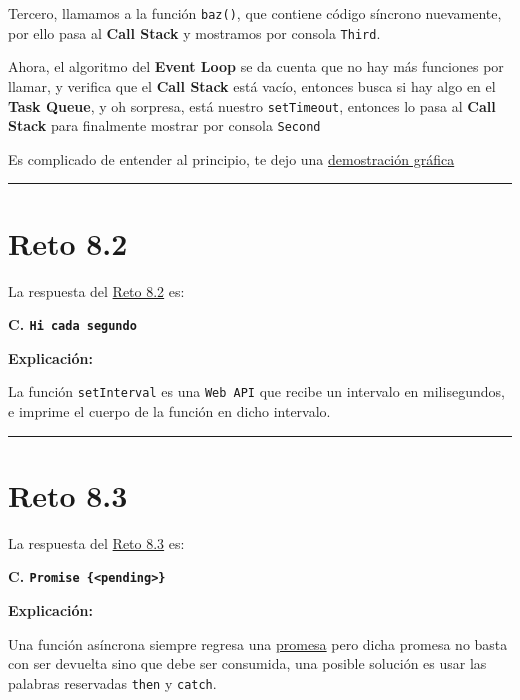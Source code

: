 \documentclass[
  letterpaper,
  DIV=11,
  numbers=noendperiod]{scrreprt}
\begin{document}
Tercero, llamamos a la función \texttt{baz()}, que contiene código
síncrono nuevamente, por ello pasa al \textbf{Call Stack} y mostramos
por consola \texttt{Third}.

Ahora, el algoritmo del \textbf{Event Loop} se da cuenta que no hay más
funciones por llamar, y verifica que el \textbf{Call Stack} está vacío,
entonces busca si hay algo en el \textbf{Task Queue}, y oh sorpresa,
está nuestro \texttt{setTimeout}, entonces lo pasa al \textbf{Call
Stack} para finalmente mostrar por consola \texttt{Second}

Es complicado de entender al principio, te dejo una
\href{https://www.jsv9000.app/?code=Y29uc3QgZm9vID0gKCkgPT4gY29uc29sZS5sb2coIkZpcnN0Iik7CmNvbnN0IGJhciA9ICgpID0\%2BIHNldFRpbWVvdXQoKCkgPT4gY29uc29sZS5sb2coIlNlY29uZCIpKTsKY29uc3QgYmF6ID0gKCkgPT4gY29uc29sZS5sb2coIlRoaXJkIik7CgpiYXIoKTsKZm9vKCk7CmJheigpOw\%3D\%3D}{demostración
gráfica}

\begin{center}\rule{0.5\linewidth}{0.5pt}\end{center}

\section{Reto 8.2}\label{sec-sol-cap8-reto2}

La respuesta del \hyperref[sec-cap8-reto2]{Reto 8.2} es:

\textbf{C. \texttt{Hi\ cada\ segundo}}

\textbf{Explicación:}

La función \texttt{setInterval} es una \texttt{Web\ API} que recibe un
intervalo en milisegundos, e imprime el cuerpo de la función en dicho
intervalo.

\begin{center}\rule{0.5\linewidth}{0.5pt}\end{center}

\section{Reto 8.3}\label{sec-sol-cap8-reto3}

La respuesta del \hyperref[sec-cap8-reto3]{Reto 8.3} es:

\textbf{C. \texttt{Promise\ \{\textless{}pending\textgreater{}\}}}

\textbf{Explicación:}

Una función asíncrona siempre regresa una
\hyperref[glos-promesa]{promesa} pero dicha promesa no basta con ser
devuelta sino que debe ser consumida, una posible solución es usar las
palabras reservadas \texttt{then} y \texttt{catch}.
\end{document}
